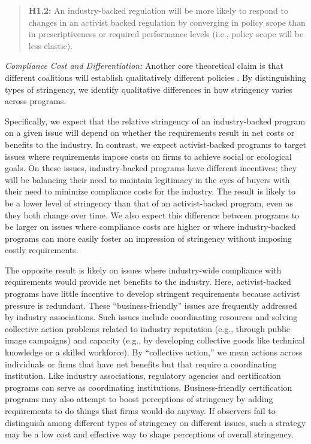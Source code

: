 \documentclass[
      12pt,
            Review ]{article}
\begin{document}
\begin{quote}
\textbf{H1.2:} An industry-backed regulation will be more likely to respond to changes in an activist backed regulation by converging in policy scope than in prescriptiveness or required performance levels (i.e., policy scope will be less elastic).
\end{quote}

\emph{Compliance Cost and Differentiation:} Another core theoretical claim is that different coalitions will establish qualitatively different policies \citep{Botzem2012, Hsueh2012}. By distinguishing types of stringency, we identify qualitative differences in how stringency varies across programs.

Specifically, we expect that the relative stringency of an industry-backed program on a given issue will depend on whether the requirements result in net costs or benefits to the industry. In contrast, we expect activist-backed programs to target issues where requirements impose costs on firms to achieve social or ecological goals. On these issues, industry-backed programs have different incentives; they will be balancing their need to maintain legitimacy in the eyes of buyers with their need to minimize compliance costs for the industry. The result is likely to be a lower level of stringency than that of an activist-backed program, even as they both change over time. We also expect this difference between programs to be larger on issues where compliance costs are higher or where industry-backed programs can more easily foster an impression of stringency without imposing costly requirements.

The opposite result is likely on issues where industry-wide compliance with requirements would provide net benefits to the industry. Here, activist-backed programs have little incentive to develop stringent requirements because activist pressure is redundant. These ``business-friendly'' issues are frequently addressed by industry associations. Such issues include coordinating resources and solving collective action problems related to industry reputation (e.g., through public image campaigns) and capacity (e.g., by developing collective goods like technical knowledge or a skilled workforce). By ``collective action,'' we mean actions across individuals or firms that have net benefits but that require a coordinating institution. Like industry associations, regulatory agencies and certification programs can serve as coordinating institutions. Business-friendly certification programs may also attempt to boost perceptions of stringency by adding requirements to do things that firms would do anyway. If observers fail to distinguish among different types of stringency on different issues, such a strategy may be a low cost and effective way to shape perceptions of overall stringency.
\end{document}
